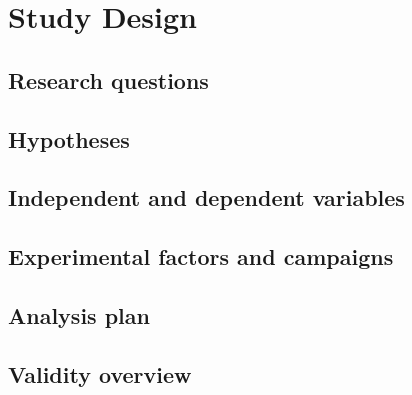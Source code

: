 \section{Study Design}
\label{sec:study-design}


\subsection{Research questions}
\label{sec:study-design:rq}

\subsection{Hypotheses}
\label{sec:study-design:hypotheses}

\subsection{Independent and dependent variables}
\label{sec:study-design:variables}

\subsection{Experimental factors and campaigns}
\label{sec:study-design:campaigns}

\subsection{Analysis plan}
\label{sec:study-design:analysis}

\subsection{Validity overview}
\label{sec:study-design:validity}
